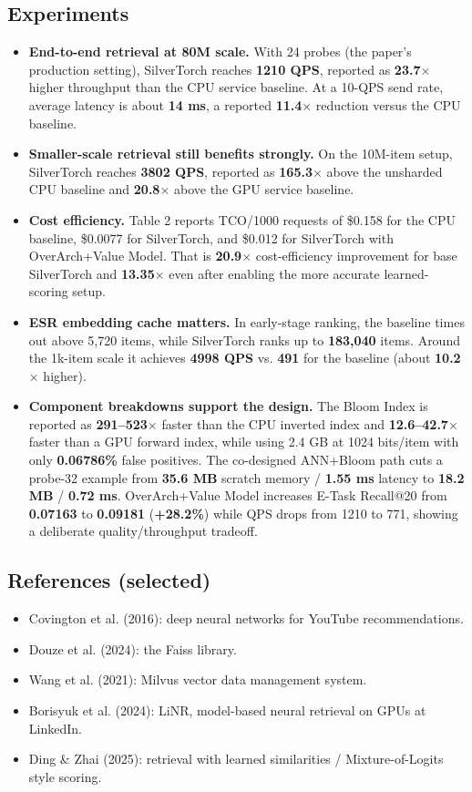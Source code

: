 \documentclass{article}
\begin{document}
\subsection*{Experiments}
\begin{itemize}[leftmargin=1.5em]
  \item \textbf{End-to-end retrieval at 80M scale.} With 24 probes (the paper's production setting), SilverTorch reaches \textbf{1210 QPS}, reported as \textbf{23.7$\times$} higher throughput than the CPU service baseline. At a 10-QPS send rate, average latency is about \textbf{14 ms}, a reported \textbf{11.4$\times$} reduction versus the CPU baseline.
  \item \textbf{Smaller-scale retrieval still benefits strongly.} On the 10M-item setup, SilverTorch reaches \textbf{3802 QPS}, reported as \textbf{165.3$\times$} above the unsharded CPU baseline and \textbf{20.8$\times$} above the GPU service baseline.
  \item \textbf{Cost efficiency.} Table 2 reports TCO/1000 requests of \$0.158 for the CPU baseline, \$0.0077 for SilverTorch, and \$0.012 for SilverTorch with OverArch+Value Model. That is \textbf{20.9$\times$} cost-efficiency improvement for base SilverTorch and \textbf{13.35$\times$} even after enabling the more accurate learned-scoring setup.
  \item \textbf{ESR embedding cache matters.} In early-stage ranking, the baseline times out above 5,720 items, while SilverTorch ranks up to \textbf{183,040} items. Around the 1k-item scale it achieves \textbf{4998 QPS} vs. \textbf{491} for the baseline (about \textbf{10.2$\times$} higher).
  \item \textbf{Component breakdowns support the design.} The Bloom Index is reported as \textbf{291--523$\times$} faster than the CPU inverted index and \textbf{12.6--42.7$\times$} faster than a GPU forward index, while using 2.4 GB at 1024 bits/item with only \textbf{0.06786\%} false positives. The co-designed ANN+Bloom path cuts a probe-32 example from \textbf{35.6 MB} scratch memory / \textbf{1.55 ms} latency to \textbf{18.2 MB} / \textbf{0.72 ms}. OverArch+Value Model increases E-Task Recall@20 from \textbf{0.07163} to \textbf{0.09181} (\textbf{+28.2\%}) while QPS drops from 1210 to 771, showing a deliberate quality/throughput tradeoff.
\end{itemize}

\subsection*{References (selected)}
\begin{itemize}[leftmargin=1.5em]
  \item Covington et al. (2016): deep neural networks for YouTube recommendations.
  \item Douze et al. (2024): the Faiss library.
  \item Wang et al. (2021): Milvus vector data management system.
  \item Borisyuk et al. (2024): LiNR, model-based neural retrieval on GPUs at LinkedIn.
  \item Ding \& Zhai (2025): retrieval with learned similarities / Mixture-of-Logits style scoring.
\end{itemize}
\end{document}
